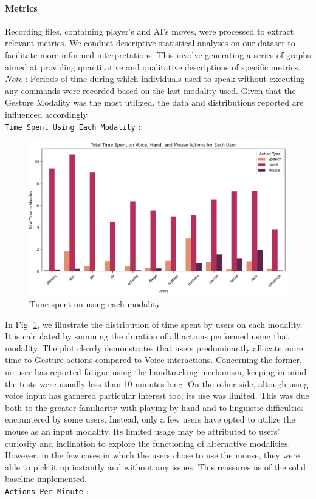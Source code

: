 \documentclass[a4paper, 11pt, twocolumn]{IEEEtran}
\begin{document}
    \paragraph*{Metrics} Recording files, containing player's and AI's moves, were processed to extract relevant metrics. We conduct descriptive statistical analyses on our dataset to facilitate more informed interpretations. This involve generating a series of graphs aimed at providing quantitative and qualitative descriptions of specific metrics. \\ \emph{Note} : Periods of time during which individuals used to speak without executing any commands were recorded based on the last modality used. Given that the Gesture Modality was the most utilized, the data and distributions reported are influenced accordingly. \\\texttt{Time Spent Using Each Modality} : 
    \begin{figure}
        \centering
        \includegraphics[width=.5\textwidth]{images/total_time.png}
        \caption{Time spent on using each modality}
        \label{fig:total_time}
    \end{figure}
    In Fig. \ref{fig:total_time}, we illustrate the distribution of time spent by users on each modality. It is calculated by summing the duration of all actions performed using that modality. The plot clearly demonstrates that users predominantly allocate more time to Gesture actions compared to Voice interactions. Concerning the former, no user has reported fatigue using the handtracking mechanism, keeping in mind the tests were usually less than 10 minutes long. On the other side, altough using voice input has garnered particular interest too, its use was limited. This was due both to the greater familiarity with playing by hand and to linguistic difficulties encountered by some users. Instead, only a few users have opted to utilize the mouse as an input modality. Its limited usage may be attributed to users' curiosity and inclination to explore the functioning of alternative modalities. However, in the few cases in which the users chose to use the mouse, they were able to pick it up instantly and without any issues. This reassures us of the solid baseline implemented.\\\texttt{Actions Per Minute} :
\end{document}

